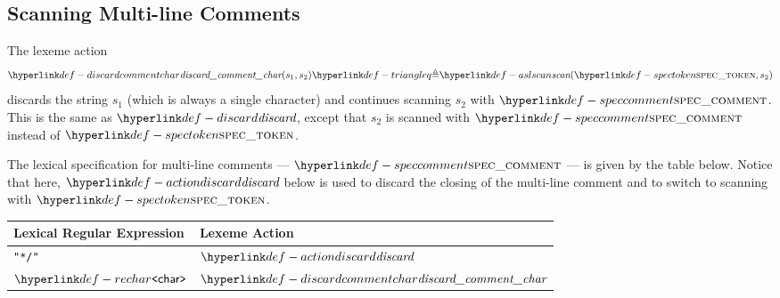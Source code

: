 \subsection{Scanning Multi-line Comments}
The lexeme action
\hypertarget{def-discardcommentchar}{}
\[
\discardcommentchar(s_1, s_2) \triangleq \aslscan(\spectoken, s_2)
\]
discards the string $s_1$ (which is always a single character) and continues scanning $s_2$ with $\speccomment$.
This is the same as $\discard$, except that $s_2$ is scanned with $\speccomment$ instead of $\spectoken$.

\hypertarget{def-speccomment}{}
The lexical specification for multi-line comments --- $\speccomment$ --- is given by the table below.
%
Notice that here, $\actiondiscard$ below is used to discard the closing of the multi-line comment and to switch
to scanning with $\spectoken$.

\begin{center}
\begin{tabular}{ll}
\textbf{Lexical Regular Expression} & \textbf{Lexeme Action}\\
\hline
\texttt{"*/"} & $\actiondiscard$ \\
$\REchar$     & $\discardcommentchar$ \\
\hline
\end{tabular}
\end{center}
